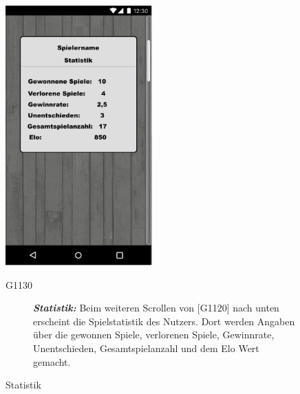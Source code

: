 \documentclass[parskip=full]{scrartcl}
\begin{document}
\begin{figure}[htp]
	\begin{minipage}[t]{6cm}
		\vspace{0pt}
		\includegraphics[height=100mm]{statistik.png}
		\caption{Statistik}
		\label{fig:Statistik}
	\end{minipage}
	\hfill
	\begin{minipage}[t]{6cm}
		\vspace{0pt}
		\begin{description}
			\item[G1130] \textbf{\textit{Statistik: }} Beim weiteren Scrollen von [G1120] nach unten erscheint die Spielstatistik des Nutzers. Dort werden Angaben über die gewonnen Spiele, verlorenen Spiele, Gewinnrate, Unentschieden, Gesamtspielanzahl und dem Elo Wert gemacht.
		\end{description}
	\end{minipage}
\end{figure}
\newpage
\clearpage
\end{document}
